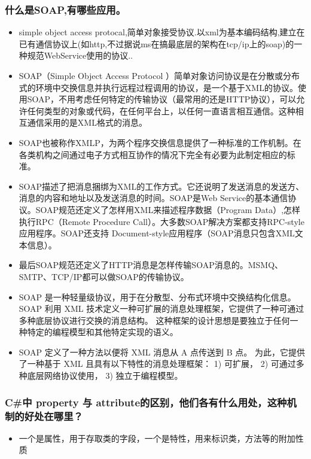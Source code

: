 \documentclass[9pt, b5paper]{article}
\begin{document}
\subsubsection{什么是SOAP,有哪些应用。}
\label{sec-1-1-75}
\begin{itemize}
\item simple object access protocal,简单对象接受协议.以xml为基本编码结构,建立在已有通信协议上(如http,不过据说ms在搞最底层的架构在tcp/ip上的soap)的一种规范WebService使用的协议..
\item SOAP（Simple Object Access Protocol ）简单对象访问协议是在分散或分布式的环境中交换信息并执行远程过程调用的协议，是一个基于XML的协议。使用SOAP，不用考虑任何特定的传输协议（最常用的还是HTTP协议），可以允许任何类型的对象或代码，在任何平台上，以任何一直语言相互通信。这种相互通信采用的是XML格式的消息。
\item SOAP也被称作XMLP，为两个程序交换信息提供了一种标准的工作机制。在各类机构之间通过电子方式相互协作的情况下完全有必要为此制定相应的标准。
\item SOAP描述了把消息捆绑为XML的工作方式。它还说明了发送消息的发送方、消息的内容和地址以及发送消息的时间。SOAP是Web Service的基本通信协议。SOAP规范还定义了怎样用XML来描述程序数据（Program Data）,怎样执行RPC（Remote Procedure Call）。大多数SOAP解决方案都支持RPC-style应用程序。SOAP还支持 Document-style应用程序（SOAP消息只包含XML文本信息）。
\item 最后SOAP规范还定义了HTTP消息是怎样传输SOAP消息的。MSMQ、SMTP、TCP/IP都可以做SOAP的传输协议。
\item SOAP 是一种轻量级协议，用于在分散型、分布式环境中交换结构化信息。 SOAP 利用 XML 技术定义一种可扩展的消息处理框架，它提供了一种可通过多种底层协议进行交换的消息结构。 这种框架的设计思想是要独立于任何一种特定的编程模型和其他特定实现的语义。
\item SOAP 定义了一种方法以便将 XML 消息从 A 点传送到 B 点。 为此，它提供了一种基于 XML 且具有以下特性的消息处理框架： 1) 可扩展， 2) 可通过多种底层网络协议使用， 3) 独立于编程模型。
\end{itemize}

\subsubsection{C\#中 property 与 attribute的区别，他们各有什么用处，这种机制的好处在哪里？}
\label{sec-1-1-76}
\begin{itemize}
\item 一个是属性，用于存取类的字段，一个是特性，用来标识类，方法等的附加性质
\end{itemize}
\end{document}
